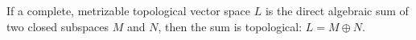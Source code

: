 If a complete, metrizable topological vector space $L$ is the direct algebraic sum of two closed subspaces $M$ and $N$, then the sum is topological: $L = M \oplus N$.
